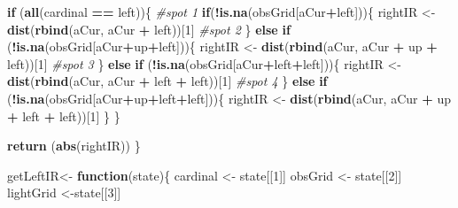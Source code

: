 \documentclass[]{article}
\newenvironment{Shaded}{\begin{snugshade}}{\end{snugshade}}
\newcommand{\CommentTok}[1]{\textcolor[rgb]{0.56,0.35,0.01}{\textit{#1}}}
\newcommand{\ControlFlowTok}[1]{\textcolor[rgb]{0.13,0.29,0.53}{\textbf{#1}}}
\newcommand{\DecValTok}[1]{\textcolor[rgb]{0.00,0.00,0.81}{#1}}
\newcommand{\KeywordTok}[1]{\textcolor[rgb]{0.13,0.29,0.53}{\textbf{#1}}}
\newcommand{\NormalTok}[1]{#1}
\newcommand{\OperatorTok}[1]{\textcolor[rgb]{0.81,0.36,0.00}{\textbf{#1}}}
\newcommand{\StringTok}[1]{\textcolor[rgb]{0.31,0.60,0.02}{#1}}
\begin{document}
\begin{Shaded}
\begin{Highlighting}[]
  \ControlFlowTok{if}\NormalTok{ (}\KeywordTok{all}\NormalTok{(cardinal }\OperatorTok{==}\StringTok{ }\NormalTok{left))\{}
    \CommentTok{#spot 1}
    \ControlFlowTok{if}\NormalTok{(}\OperatorTok{!}\KeywordTok{is.na}\NormalTok{(obsGrid[aCur}\OperatorTok{+}\NormalTok{left]))\{}
\NormalTok{         rightIR <-}\StringTok{ }\KeywordTok{dist}\NormalTok{(}\KeywordTok{rbind}\NormalTok{(aCur, aCur }\OperatorTok{+}\StringTok{ }\NormalTok{left))[}\DecValTok{1}\NormalTok{]}
         \CommentTok{#spot 2}
\NormalTok{    \} }\ControlFlowTok{else} \ControlFlowTok{if}\NormalTok{ (}\OperatorTok{!}\KeywordTok{is.na}\NormalTok{(obsGrid[aCur}\OperatorTok{+}\NormalTok{up}\OperatorTok{+}\NormalTok{left]))\{}
\NormalTok{       rightIR <-}\StringTok{ }\KeywordTok{dist}\NormalTok{(}\KeywordTok{rbind}\NormalTok{(aCur, aCur }\OperatorTok{+}\StringTok{ }\NormalTok{up }\OperatorTok{+}\StringTok{ }\NormalTok{left))[}\DecValTok{1}\NormalTok{]}
       \CommentTok{#spot 3}
\NormalTok{    \} }\ControlFlowTok{else} \ControlFlowTok{if}\NormalTok{ (}\OperatorTok{!}\KeywordTok{is.na}\NormalTok{(obsGrid[aCur}\OperatorTok{+}\NormalTok{left}\OperatorTok{+}\NormalTok{left]))\{}
\NormalTok{    rightIR <-}\StringTok{ }\KeywordTok{dist}\NormalTok{(}\KeywordTok{rbind}\NormalTok{(aCur, aCur }\OperatorTok{+}\StringTok{ }\NormalTok{left }\OperatorTok{+}\StringTok{ }\NormalTok{left))[}\DecValTok{1}\NormalTok{]}
    \CommentTok{#spot 4}
\NormalTok{    \} }\ControlFlowTok{else} \ControlFlowTok{if}\NormalTok{ (}\OperatorTok{!}\KeywordTok{is.na}\NormalTok{(obsGrid[aCur}\OperatorTok{+}\NormalTok{up}\OperatorTok{+}\NormalTok{left}\OperatorTok{+}\NormalTok{left]))\{}
\NormalTok{      rightIR <-}\StringTok{ }\KeywordTok{dist}\NormalTok{(}\KeywordTok{rbind}\NormalTok{(aCur, aCur }\OperatorTok{+}\StringTok{ }\NormalTok{up }\OperatorTok{+}\StringTok{ }\NormalTok{left }\OperatorTok{+}\StringTok{ }\NormalTok{left))[}\DecValTok{1}\NormalTok{]}
\NormalTok{    \}}
\NormalTok{  \}}
  
  \KeywordTok{return}\NormalTok{ (}\KeywordTok{abs}\NormalTok{(rightIR))}
\NormalTok{\}}
    
    
\NormalTok{getLeftIR<-}\StringTok{ }\ControlFlowTok{function}\NormalTok{(state)\{}
\NormalTok{    cardinal <-}\StringTok{ }\NormalTok{state[[}\DecValTok{1}\NormalTok{]]}
\NormalTok{  obsGrid <-}\StringTok{ }\NormalTok{state[[}\DecValTok{2}\NormalTok{]]}
\NormalTok{  lightGrid <-state[[}\DecValTok{3}\NormalTok{]]}
  

\end{Highlighting}
\end{Shaded}
\end{document}
